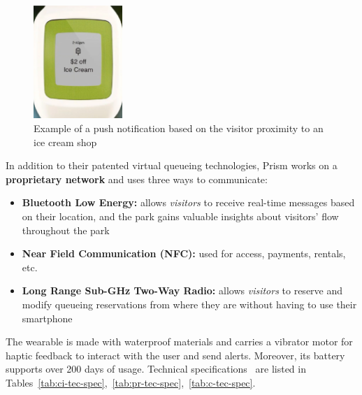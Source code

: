 \begin{figure}[H]
    \centering
    \includegraphics[width=0.3\textwidth]{img/prism-icecream}
    \caption{Example of a push notification based on the visitor proximity to an ice cream shop}
    \label{fig:prism-icecream}
\end{figure}

In addition to their patented virtual queueing technologies, Prism works on a \textbf{proprietary network} and uses three ways to communicate:
\begin{itemize}
    \item \textbf{Bluetooth Low Energy:} allows \textit{visitors} to receive real-time messages based on their location, and the park gains valuable insights about visitors' flow throughout the park
    \item \textbf{Near Field Communication (NFC):} used for access, payments, rentals, etc.
    \item \textbf{Long Range Sub-GHz Two-Way Radio:} allows \textit{visitors} to reserve and modify queueing reservations from where they are without having to use their smartphone
\end{itemize}

The wearable is made with waterproof materials and carries a vibrator motor for haptic feedback to interact with the user and send alerts.
Moreover, its battery supports over 200 days of usage.
Technical specifications~\cite{prism-manual} are listed in Tables~\ref{tab:ci-tec-spec},~\ref{tab:pr-tec-spec},~\ref{tab:c-tec-spec}.

